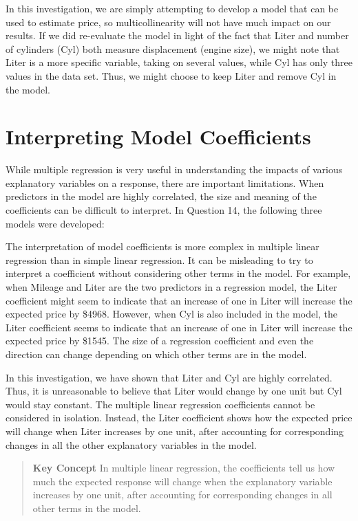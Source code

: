 \documentclass[
]{report}
\theoremstyle{definition}
\theoremstyle{definition}
\theoremstyle{definition}
\theoremstyle{definition}
\theoremstyle{remark}
\begin{document}
In this investigation, we are simply attempting to develop a model that can be used to estimate price, so multicollinearity will not have much impact on our results. If we did re-evaluate the model in light of the fact that Liter and number of cylinders (Cyl) both measure displacement (engine size), we might note that Liter is a more specific variable, taking on several values, while Cyl has only three values in the data set. Thus, we might choose to keep Liter and remove Cyl in the model.

\hypertarget{interpreting-model-coefficients}{%
\section{Interpreting Model Coefficients}\label{interpreting-model-coefficients}}

While multiple regression is very useful in understanding the impacts of various explanatory variables on a response, there are important limitations. When predictors in the model are highly correlated, the size and meaning of the coefficients can be difficult to interpret. In Question 14, the following three models were developed:

The interpretation of model coefficients is more complex in multiple linear regression than in simple linear regression. It can be misleading to try to interpret a coefficient without considering other terms in the model. For example, when Mileage and Liter are the two predictors in a regression model, the Liter coefficient might seem to indicate that an increase of one in Liter will increase the expected price by \$4968. However, when Cyl is also included in the model, the Liter coefficient seems to indicate that an increase of one in Liter will increase the expected price by \$1545. The size of a regression coefficient and even the direction can change depending on which other terms are in the model.

In this investigation, we have shown that Liter and Cyl are highly correlated. Thus, it is unreasonable to believe that Liter would change by one unit but Cyl would stay constant. The multiple linear regression coefficients cannot be considered in isolation. Instead, the Liter coefficient shows how the expected price will change when Liter increases by one unit, after accounting for corresponding changes in all the other
explanatory variables in the model.

\begin{quote}
\textbf{Key Concept}
In multiple linear regression, the coefficients tell us how much the expected response will change when the explanatory variable increases by one unit, after accounting for corresponding changes in all other terms in the model.
\end{quote}
\end{document}
